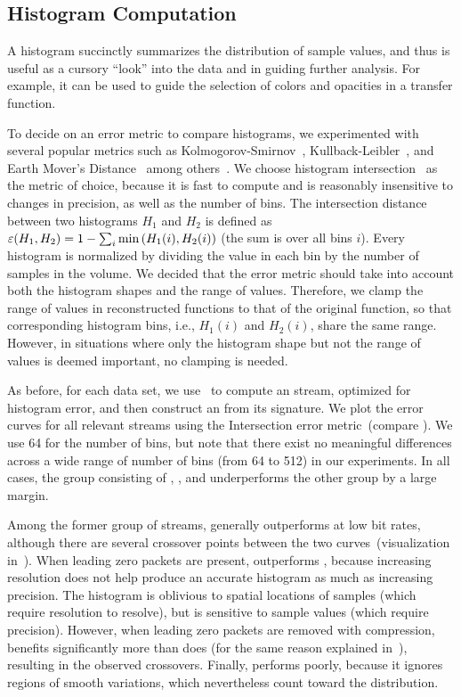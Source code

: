 \subsection{Histogram Computation}\label{sec:histogram}

A histogram succinctly summarizes the distribution of sample values, and thus is useful as a cursory
``look'' into the data and in guiding further analysis. For example, it can be used to guide the
selection of colors and opacities in a transfer function.

To decide on an error metric to compare histograms, we experimented with several popular
metrics such as Kolmogorov-Smirnov~\cite{smirnov1948}, Kullback-Leibler~\cite{kullback1951}, and
Earth Mover's Distance~\cite{emd1998} among others~\cite{Hellinger1909,Bhattacharyya1943}. We choose
histogram intersection~\cite{histogram_intersection1991} as the metric of choice, because it is fast
to compute and is reasonably insensitive to changes in precision, as well as the number of bins. The
intersection distance between two histograms $H_1$ and $H_2$ is defined as
$\err(H_1,H_2)=1-\sum_{i}{\min{(H_1(i),H_2(i))}}$ (the sum is over all bins $i$). Every histogram is
normalized by dividing the value in each bin by the number of samples in the volume. We decided
that the error metric should take into account both the histogram shapes and the range of values.
Therefore, we clamp the range of values in reconstructed functions to that of the original function,
so that corresponding histogram bins, i.e., $H_1(i)$ and $H_2(i)$, share the same range. However, in
situations where only the histogram shape but not the range of values is deemed important, no
clamping is needed.

As before, for each data set, we use~ to compute an \shop stream, optimized for
histogram error, and then construct an \shsg from its signature. We plot the error curves for all
relevant streams using the Intersection error metric~(compare
). We use 64 for the number of bins, but note that there exist
no meaningful differences across a wide range of number of bins (from 64 to 512) in our experiments.
In all cases, the group consisting of \sbit, \slvl, and \smag underperforms the other group by a
large margin.

Among the former group of streams, \slvl generally outperforms \sbit at low bit rates, although
there are several crossover points between the two curves~(visualization
in~). When leading zero packets are present, \slvl outperforms \sbit,
because increasing resolution does not help produce an accurate histogram as much as increasing
precision. The histogram is oblivious to spatial locations of samples (which require resolution to
resolve), but is sensitive to sample values (which require precision). However, when leading zero
packets are removed with compression, \sbit benefits significantly more than \slvl does (for the
same reason explained in~), resulting in the observed crossovers. Finally,
\smag performs poorly, because it ignores regions of smooth variations, which nevertheless count
toward the distribution.

